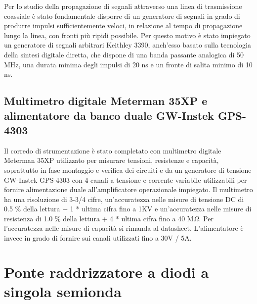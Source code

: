 \documentclass[journal]{IEEEtran}
\begin{document}
Per lo studio della propagazione di segnali attraverso una linea di trasmissione coassiale è stato fondamentale disporre di un generatore di segnali in grado di produrre impulsi sufficientemente veloci, in relazione al tempo di propagazione lungo la linea, con fronti più ripidi possibile. Per questo motivo è stato impiegato un generatore di segnali arbitrari Keithley 3390, anch'esso basato sulla tecnologia della sintesi digitale diretta, che dispone di una banda passante analogica di 50 MHz, una durata minima degli impulsi di 20 ns e un fronte di salita minimo di 10 ns.

\subsection{\textbf{Multimetro digitale Meterman 35XP e alimentatore da banco duale GW-Instek GPS-4303}}
Il corredo di strumentazione è stato completato con multimetro digitale Meterman 35XP utilizzato per misurare tensioni, resistenze e capacità, soprattutto in fase montaggio e verifica dei circuiti e da un generatore di tensione GW-Instek GPS-4303 con 4 canali a tensione e corrente variabile utilizzabili per fornire alimentazione duale all'amplificatore operazionale impiegato. Il multimetro ha una risoluzione di 3-3/4 cifre, un'accuratezza nelle misure di tensione DC di 0.5 \% della lettura + 1 * ultima cifra fino a 1KV e un'accuratezza nelle misure di resistenza di 1.0 \% della lettura + 4 * ultima cifra fino a 40 M$\Omega$. Per l'accuratezza nelle misure di capacità si rimanda al datasheet. L'alimentatore è invece in grado di fornire sui canali utilizzati fino a 30V / 5A.

\section{\textbf{Ponte raddrizzatore a diodi a singola semionda}} %
\end{document}
